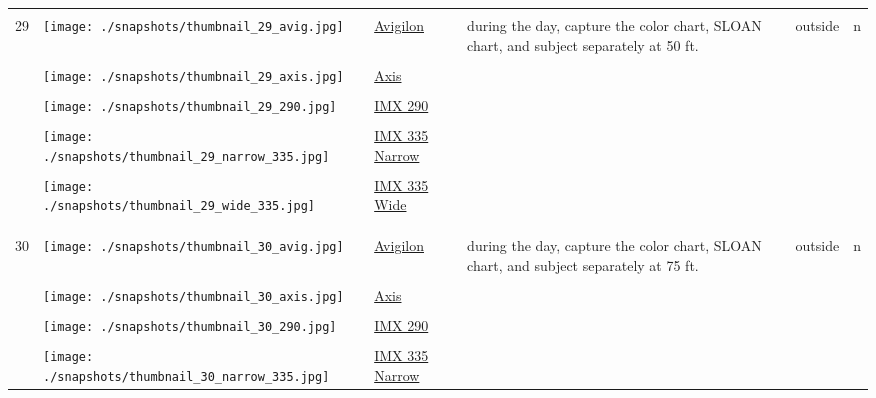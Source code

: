 \documentclass{article}%
\begin{document}
\begin{longtabu}{m{2.5cm} m{4cm} m{2cm} m{4cm} m{2cm} m{2cm}}
&&&&&\\%
\hline%
&&&&&\\%
29&\texttt{[image: ./snapshots/thumbnail\_29\_avig.jpg]}&\href{https://drive.google.com/file/d/1A8bb2ZhAel2Dzxs6RZn98LkgYMb-dRRa/view?usp=sharing}{Avigilon}&during the day, capture the color chart, SLOAN chart, and subject separately at 50 ft.&outside&n\\%
&&&&&\\%
&\texttt{[image: ./snapshots/thumbnail\_29\_axis.jpg]}&\href{https://drive.google.com/file/d/1f293NRKOXEMXiNMW7CCLtVVFHFLtdeqr/view?usp=sharing}{Axis}&&&\\%
&&&&&\\%
&\texttt{[image: ./snapshots/thumbnail\_29\_290.jpg]}&\href{https://drive.google.com/file/d/1b40azbbFnXwDWgg_NyUB7nRJQA4LEJnt/view?usp=sharing}{IMX 290}&&&\\%
&&&&&\\%
&\texttt{[image: ./snapshots/thumbnail\_29\_narrow\_335.jpg]}&\href{https://drive.google.com/file/d/1C6KwgQPezLFlMDNt8QUyUVuRU9H7s2F6/view?usp=sharing}{IMX 335 Narrow}&&&\\%
&&&&&\\%
&\texttt{[image: ./snapshots/thumbnail\_29\_wide\_335.jpg]}&\href{https://drive.google.com/file/d/1EPdwds0dgAMoAoiZEL2MWgSOyViSm9ht/view?usp=sharing}{IMX 335 Wide}&&&\\%
&&&&&\\%
&&&&&\\%
\hline%
&&&&&\\%
30&\texttt{[image: ./snapshots/thumbnail\_30\_avig.jpg]}&\href{https://drive.google.com/file/d/15nyU6uBKe6zKD-dEezt7OkeuzLYKIaJN/view?usp=sharing}{Avigilon}&during the day, capture the color chart, SLOAN chart, and subject separately at 75 ft.&outside&n\\%
&&&&&\\%
&\texttt{[image: ./snapshots/thumbnail\_30\_axis.jpg]}&\href{https://drive.google.com/file/d/1ciGcys68b6MeliPgYgnIuaCuMBD3HwPB/view?usp=sharing}{Axis}&&&\\%
&&&&&\\%
&\texttt{[image: ./snapshots/thumbnail\_30\_290.jpg]}&\href{https://drive.google.com/file/d/1MvzLJEXitJo3j0HWRoMQYG9CBBCgGI0j/view?usp=sharing}{IMX 290}&&&\\%
&&&&&\\%
&\texttt{[image: ./snapshots/thumbnail\_30\_narrow\_335.jpg]}&\href{https://drive.google.com/file/d/1XepXsWPqrQ5-7NPvB8dNFI8eV7vM3WqP/view?usp=sharing}{IMX 335 Narrow}&&&\\%

\end{longtabu}
\end{document}
